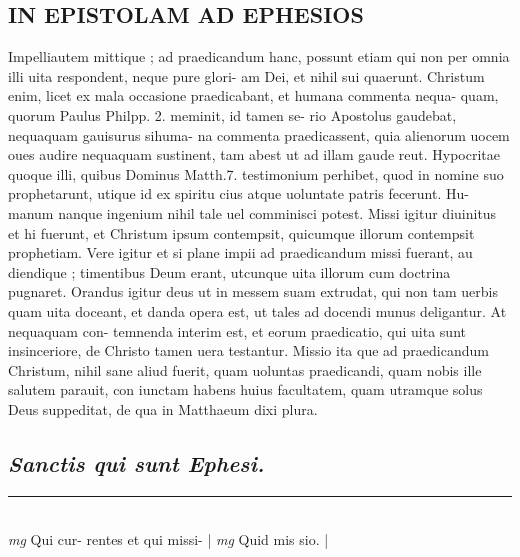 \documentclass{article}
\begin{document}
\begin{pages}
\section*{IN EPISTOLAM AD EPHESIOS }\pstart Impelliautem mittique ; ad praedicandum hanc, possunt etiam qui non per omnia illi uita respondent, neque pure glori- am Dei, et nihil sui quaerunt. Christum enim, licet ex mala occasione praedicabant, et humana commenta nequa- quam, quorum Paulus Philpp. 2. meminit, id tamen se- rio Apostolus gaudebat, nequaquam gauisurus sihuma- na commenta praedicassent, quia alienorum uocem oues audire nequaquam sustinent, tam abest ut ad illam gaude reut. Hypocritae quoque illi, quibus Dominus Matth.7. testimonium perhibet, quod in nomine suo prophetarunt, utique  id ex spiritu cius atque  uoluntate patris fecerunt. Hu- manum nanque ingenium nihil tale uel comminisci potest.  Missi igitur diuinitus et hi fuerunt, et Christum ipsum contempsit, quicumque  illorum contempsit prophetiam.  Vere igitur et si plane impii ad praedicandum missi fuerant, au diendique ; timentibus Deum erant, utcunque uita illorum cum doctrina pugnaret.   \pend\pstart Orandus igitur deus ut in messem suam extrudat, qui non tam uerbis quam uita doceant, et danda opera est, ut tales ad docendi munus deligantur. At nequaquam con- temnenda interim est, et eorum praedicatio, qui uita sunt insinceriore, de Christo tamen uera testantur.  Missio ita que ad praedicandum Christum, nihil sane aliud fuerit, quam uoluntas praedicandi, quam nobis ille salutem parauit, con iunctam habens huius facultatem, quam utramque solus Deus suppeditat, de qua in Matthaeum dixi plura.   \pend
{}
{}
\subsection*{\textit{Sanctis qui sunt Ephesi. }}
\vspace{0.5cm}\noindent
\vspace{0.2cm}\rule{1cm}{0.2pt}\\ 
\hspace{0.2cm}\textit{mg}
\footnotesize Qui cur- rentes et qui missi- 
\normalsize| 
\hspace{0.2cm}\textit{mg}
\footnotesize Quid mis sio.  
\normalsize| 

\end{pages}
\end{document}
